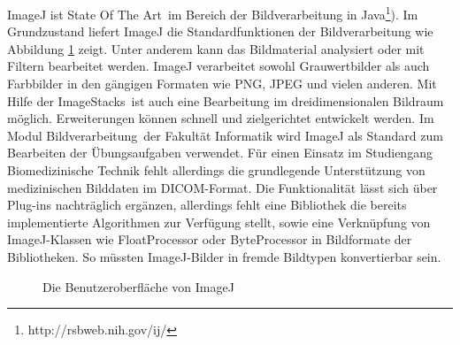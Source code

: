 ImageJ ist \glqq State Of The Art\grqq\ im Bereich der Bildverarbeitung in Java\footnote{http://rsbweb.nih.gov/ij/}). Im Grundzustand liefert ImageJ die Standardfunktionen der Bildverarbeitung wie Abbildung \ref{imagej} zeigt. Unter anderem kann das Bildmaterial analysiert oder mit Filtern bearbeitet werden. ImageJ verarbeitet sowohl Grauwertbilder als auch Farbbilder in den gängigen Formaten wie PNG, JPEG und vielen anderen. Mit Hilfe der \glqq ImageStacks\grqq\ ist auch eine Bearbeitung im dreidimensionalen Bildraum möglich. Erweiterungen können schnell und zielgerichtet entwickelt werden. Im Modul \glqq Bildverarbeitung\grqq\ der Fakultät Informatik wird ImageJ als Standard zum Bearbeiten der Übungsaufgaben verwendet. Für einen Einsatz im Studiengang Biomedizinische Technik fehlt allerdings die grundlegende Unterstützung von medizinischen Bilddaten im DICOM-Format. Die Funktionalität lässt sich über Plug-ins nachträglich ergänzen, allerdings fehlt eine Bibliothek die bereits implementierte Algorithmen zur Verfügung stellt, sowie eine Verknüpfung von ImageJ-Klassen wie FloatProcessor oder ByteProcessor in Bildformate der Bibliotheken. So müssten ImageJ-Bilder in fremde Bildtypen konvertierbar sein.

\begin{figure}[htbp]
  \vspace{0.5cm}
  \centering
  \caption{Die Benutzeroberfläche von ImageJ}
  \label{imagej}
  \vspace{0.5cm}
\end{figure}

